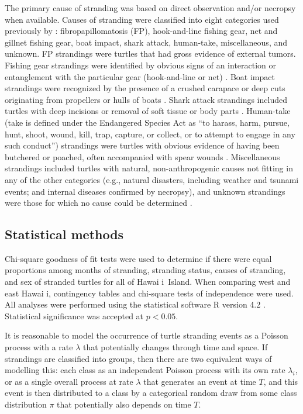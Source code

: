 \documentclass[sn-basic,NameDate]{sn-jnl}\usepackage[]{graphicx}\usepackage[]{xcolor}
\DeclareRobustCommand{\okina}{%
  \raisebox{\dimexpr\fontcharht\font`A-\height}{%
    \scalebox{0.8}{`}%
  }%
}
\newcommand{\Hawaii}{Hawai\okina i}
\begin{document}
The primary cause of stranding was based on direct observation and/or necropsy when available. Causes of stranding were classified into eight categories used previously by \cite{chaloupka2008cause}: fibropapillomatosis (FP), hook-and-line fishing gear, net and gillnet fishing gear, boat impact, shark attack, human-take, miscellaneous, and unknown.
FP strandings were turtles that had gross evidence of external tumors. 
Fishing gear strandings were identified by obvious signs of an interaction or entanglement with the particular gear (hook-and-line or net) \citep{boulon2000trends, chaloupka2008cause}. 
Boat impact strandings were recognized by the presence of a crushed carapace or deep cuts originating from propellers or hulls of boats \citep{boulon2000trends, guimares2021distribution}. 
Shark attack strandings included turtles with deep incisions or removal of soft tissue or body parts \citep{stacy2021scavenging}. 
Human-take (take is defined under the Endangered Species Act as ``to harass, harm, pursue, hunt, shoot, wound, kill, trap, capture, or collect, or to attempt to engage in any such conduct'') strandings were turtles with obvious evidence of having been butchered or poached, often accompanied with spear wounds \citep{boulon2000trends}. 
Miscellaneous strandings included turtles with natural, non-anthropogenic causes not fitting in any of the other categories (e.g., natural disasters, including weather and tsunami events; and internal diseases confirmed by necropsy), and unknown strandings were those for which no cause could be determined \citep{chaloupka2008cause}. 

\subsection{Statistical methods}
Chi-square goodness of fit tests were used to determine if there were equal proportions among months of stranding, stranding status, causes of stranding, and sex of stranded turtles for all of \Hawaii\ Island. When comparing west and east \Hawaii, contingency tables and chi-square tests of independence were used. All analyses were performed using the statistical software R version 4.2 \citep{rcore2022}. Statistical significance was accepted at $p < 0.05$. 

It is reasonable to model the occurrence of turtle stranding events as a Poisson process with a rate $\lambda$ that potentially changes through time and space. 
If strandings are classified  into groups, then there are two equivalent ways of modelling this: 
each class as an independent Poisson process with its own rate $\lambda_i$, 
or as a single overall process at rate $\lambda$ that generates an event at time $T$, and this event is then distributed to a class by a categorical random draw from some class distribution $\pi$ that potentially also depends on time $T$.
\end{document}
